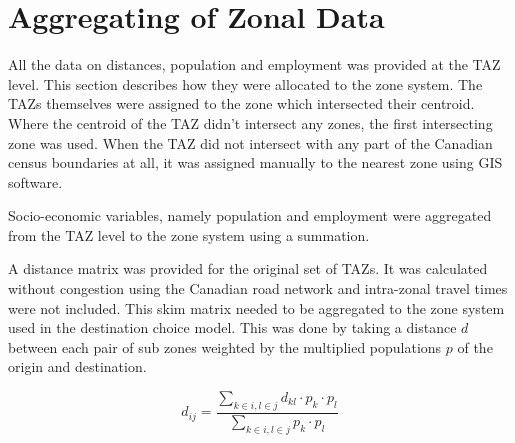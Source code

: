 \section{Aggregating of Zonal Data}
All the data on distances, population and employment was provided at the TAZ level. This section describes how they were allocated to the zone system. The TAZs themselves were assigned to the zone which intersected their centroid. Where the centroid of the TAZ didn't intersect any zones, the first intersecting zone was used. When the TAZ did not intersect with any part of the Canadian census boundaries at all, it was assigned manually to the nearest zone using GIS software.

Socio-economic variables, namely population and employment were aggregated from the TAZ level to the zone system using a summation.

A distance matrix was provided for the original set of TAZs. It was calculated without congestion using the Canadian road network and intra-zonal travel times were not included. This skim matrix needed to be aggregated to the zone system used in the destination choice model. This was done by taking a distance $d$ between each pair of sub zones weighted by the multiplied populations $p$ of the origin and destination.

$$ d_{ij} = 
\frac{
\sum_{k \in i, l \in j} d_{kl} \cdot p_k \cdot p_l}
{
\sum_{k \in i, l \in j} p_k \cdot p_l
} 
$$


